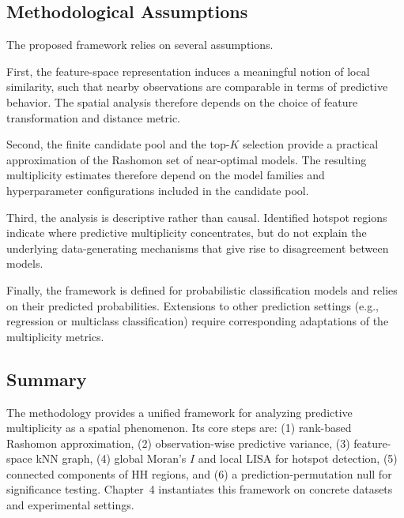 \subsection{Methodological Assumptions}
\label{sec:meth-assumptions}

The proposed framework relies on several assumptions.

First, the feature-space representation induces a meaningful notion of local similarity,
such that nearby observations are comparable in terms of predictive behavior. The spatial
analysis therefore depends on the choice of feature transformation and distance metric.

Second, the finite candidate pool and the top-$K$ selection provide a practical
approximation of the Rashomon set of near-optimal models. The resulting multiplicity
estimates therefore depend on the model families and hyperparameter configurations
included in the candidate pool.

Third, the analysis is descriptive rather than causal. Identified hotspot regions indicate
where predictive multiplicity concentrates, but do not explain the underlying
data-generating mechanisms that give rise to disagreement between models.

Finally, the framework is defined for probabilistic classification models and relies on
their predicted probabilities. Extensions to other prediction settings (e.g., regression or
multiclass classification) require corresponding adaptations of the multiplicity metrics.

\subsection{Summary}

The methodology provides a unified framework for analyzing predictive multiplicity as a
spatial phenomenon. Its core steps are: (1) rank-based Rashomon approximation,
(2) observation-wise predictive variance, (3) feature-space kNN graph, (4) global
Moran's $I$ and local LISA for hotspot detection, (5) connected components of HH
regions, and (6) a prediction-permutation null for significance testing. Chapter~4
instantiates this framework on concrete datasets and experimental settings.